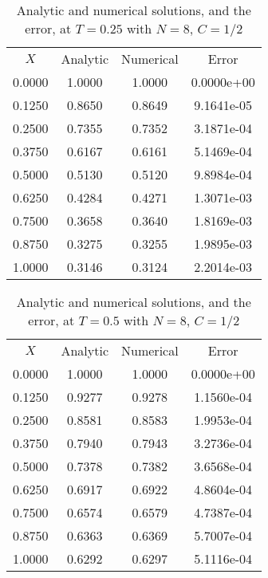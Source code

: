 \documentclass[12pt]{extarticle}
\begin{document}
\begin{table}[htp!]
\caption{Analytic and numerical solutions, and the error, at $T=0.25$ with $N=8$, $C=1/2$ }
\centering
\begin{tabular}{cccc}
\\
$X$ & Analytic & Numerical & Error \\ [0.5ex]
0.0000 & 1.0000 & 1.0000 & 0.0000e+00 \\ 
0.1250 & 0.8650 & 0.8649 & 9.1641e-05 \\ 
0.2500 & 0.7355 & 0.7352 & 3.1871e-04 \\ 
0.3750 & 0.6167 & 0.6161 & 5.1469e-04 \\ 
0.5000 & 0.5130 & 0.5120 & 9.8984e-04 \\ 
0.6250 & 0.4284 & 0.4271 & 1.3071e-03 \\ 
0.7500 & 0.3658 & 0.3640 & 1.8169e-03 \\ 
0.8750 & 0.3275 & 0.3255 & 1.9895e-03 \\ 
1.0000 & 0.3146 & 0.3124 & 2.2014e-03 \\ 
\end{tabular}
\label{table:3}
\end{table}

\begin{table}[htp!]
\caption{Analytic and numerical solutions, and the error, at $T=0.5$ with $N=8$, $C=1/2$ }
\centering
\begin{tabular}{cccc}
\\
$X$ & Analytic & Numerical & Error \\ [0.5ex]
0.0000 & 1.0000 & 1.0000 & 0.0000e+00 \\ 
0.1250 & 0.9277 & 0.9278 & 1.1560e-04 \\ 
0.2500 & 0.8581 & 0.8583 & 1.9953e-04 \\ 
0.3750 & 0.7940 & 0.7943 & 3.2736e-04 \\ 
0.5000 & 0.7378 & 0.7382 & 3.6568e-04 \\ 
0.6250 & 0.6917 & 0.6922 & 4.8604e-04 \\ 
0.7500 & 0.6574 & 0.6579 & 4.7387e-04 \\ 
0.8750 & 0.6363 & 0.6369 & 5.7007e-04 \\ 
1.0000 & 0.6292 & 0.6297 & 5.1116e-04 \\ 
\end{tabular}
\label{table:4}
\end{table}
\end{document}
